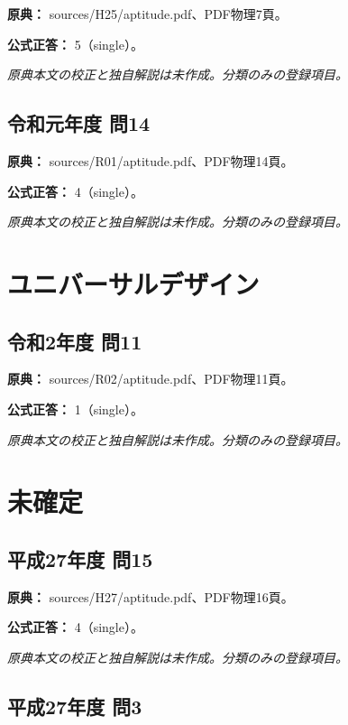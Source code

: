 \noindent\textbf{原典：} sources/H25/aptitude.pdf、PDF物理7頁。

\textbf{公式正答：} 5（single）。

\par\textit{原典本文の校正と独自解説は未作成。分類のみの登録項目。}

\subsection{令和元年度 問14}
\label{q:r01-reg-apt-14}

\noindent\textbf{原典：} sources/R01/aptitude.pdf、PDF物理14頁。

\textbf{公式正答：} 4（single）。

\par\textit{原典本文の校正と独自解説は未作成。分類のみの登録項目。}

\section{ユニバーサルデザイン}

\subsection{令和2年度 問11}
\label{q:r02-reg-apt-11}

\noindent\textbf{原典：} sources/R02/aptitude.pdf、PDF物理11頁。

\textbf{公式正答：} 1（single）。

\par\textit{原典本文の校正と独自解説は未作成。分類のみの登録項目。}

\section{未確定}

\subsection{平成27年度 問15}
\label{q:h27-reg-apt-15}

\noindent\textbf{原典：} sources/H27/aptitude.pdf、PDF物理16頁。

\textbf{公式正答：} 4（single）。

\par\textit{原典本文の校正と独自解説は未作成。分類のみの登録項目。}

\subsection{平成27年度 問3}
\label{q:h27-reg-apt-03}

